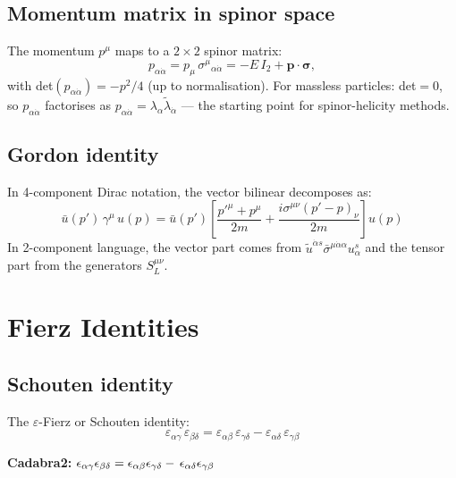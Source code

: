 \subsection{Momentum matrix in spinor space}

The momentum $p^\mu$ maps to a $2\times2$ spinor matrix:
\begin{equation}
  p_{\alpha\dot\alpha} = p_\mu\,\sigma^\mu{}_{\alpha\dot\alpha}
  = -E\,I_2 + \mathbf{p}\cdot\boldsymbol\sigma,
\end{equation}
with det$(p_{\alpha\dot\alpha}) = -p^2/4$ (up to normalisation).
For massless particles: det$=0$, so $p_{\alpha\dot\alpha}$ factorises as
$p_{\alpha\dot\alpha} = \lambda_\alpha\tilde\lambda_{\dot\alpha}$ ---
the starting point for spinor-helicity methods.

\subsection{Gordon identity}

In 4-component Dirac notation, the vector bilinear decomposes as:
\begin{equation}
  \bar u(p')\,\gamma^\mu\,u(p)
  = \bar u(p')\!\left[\frac{p'^\mu+p^\mu}{2m}
    + \frac{i\sigma^{\mu\nu}(p'-p)_\nu}{2m}\right]\!u(p)
\end{equation}
In 2-component language, the vector part comes from
$\tilde u^{\dot\alpha s}\bar\sigma^{\mu\dot\alpha\alpha}u^s_\alpha$
and the tensor part from the generators $S^{\mu\nu}_L$.

\section{Fierz Identities}

\subsection{Schouten identity}

The $\varepsilon$-Fierz or Schouten identity:
\begin{equation}
  \boxed{
    \varepsilon_{\alpha\gamma}\,\varepsilon_{\beta\delta}
    = \varepsilon_{\alpha\beta}\,\varepsilon_{\gamma\delta}
    - \varepsilon_{\alpha\delta}\,\varepsilon_{\gamma\beta}
  }
  \tag{38.17}
\end{equation}

\textbf{Cadabra2:} $\epsilon_{\alpha \gamma} \epsilon_{\beta \delta} = \epsilon_{\alpha \beta} \epsilon_{\gamma \delta}\discretionary{}{}{}-\,\epsilon_{\alpha \delta} \epsilon_{\gamma \beta}$

